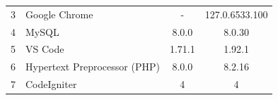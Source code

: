 \begin{enumerate}
\begin{longtable}{clcc}
		      3                               & Google Chrome                & -                                          & 127.0.6533.100                              \\
		      4                               & MySQL                        & 8.0.0                                      & 8.0.30                                      \\
		      5                               & VS Code                      & 1.71.1                                     & 1.92.1                                      \\
		      6                               & Hypertext Preprocessor (PHP) & 8.0.0                                      & 8.2.16                                      \\
		      7                               & CodeIgniter                  & 4                                          & 4                                           \\ \hline
	      \end{longtable}


\end{enumerate}

